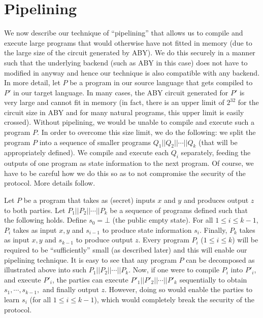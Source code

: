 \section{Pipelining}
\label{sec:pipe}
We now describe our technique of ``pipelining'' that allows us to compile and execute large programs that would otherwise have not fitted in memory (due to the large size of the circuit generated by ABY). We do this securely in a manner such that the underlying backend (such as ABY in this case) does not have to modified in anyway and hence our technique is also compatible with any backend. In more detail, let $P$ be a program in our source language that gets compiled to $P'$ in our target language. In many cases, the ABY circuit generated for $P'$ is very large and cannot fit in memory (in fact, there is an upper limit of $2^{32}$ for the circuit size in ABY and for many natural programs, this upper limit is easily crossed). Without pipelining, we would be unable to compile and execute such a program $P$. In order to overcome this size limit, we do the following: we split the program $P$ into a sequence of smaller programs $Q_1||Q_2||\cdots||Q_k$ (that will be appropriately defined). We compile and execute each $Q_i$ separately, feeding the outputs of one program as state information to the next program. Of course, we have to be careful how we do this so as to not compromise the security of the protocol. More details follow.

Let $P$ be a program that takes as (secret) inputs $x$ and $y$ and produces output $z$ to both parties. Let $P_1||P_2||\cdots||P_k$ be a sequence of programs defined such that the following holds. Define $s_0 = \bot$ (the public empty state). For all $1\leq i\leq k-1$, $P_i$ takes as input $x, y$ and $s_{i-1}$ to produce state information $s_i$. Finally, $P_k$ takes as input $x,y$ and $s_{k-1}$ to produce output $z$. Every program $P_i$ ($1\leq i\leq k$) will be required to be ``sufficiently'' small (as described later) and this will enable our pipelining technique. It is easy to see that any program $P$ can be decomposed as illustrated above into such $P_1||P_2||\cdots||P_k$. Now, if one were to compile $P_i$ into $P'_i$, and execute $P'_i$, the parties can execute $P'_1||P'_2||\cdots||P'_k$ sequentially to obtain $s_1,\cdots,s_{k-1},$ and finally output $z$. However, doing so would enable the parties to learn $s_i$ (for all $1\leq i\leq k-1$), which would completely break the security of the protocol.

